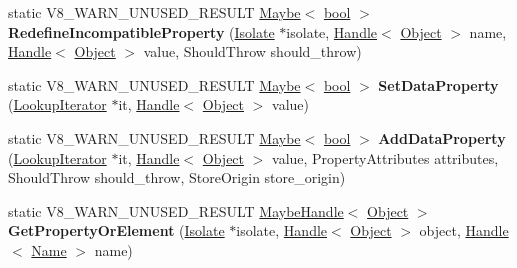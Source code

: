 \begin{DoxyCompactItemize}
static V8\+\_\+\+W\+A\+R\+N\+\_\+\+U\+N\+U\+S\+E\+D\+\_\+\+R\+E\+S\+U\+LT \mbox{\hyperlink{classv8_1_1Maybe}{Maybe}}$<$ \mbox{\hyperlink{classbool}{bool}} $>$ {\bfseries Redefine\+Incompatible\+Property} (\mbox{\hyperlink{classv8_1_1internal_1_1Isolate}{Isolate}} $\ast$isolate, \mbox{\hyperlink{classv8_1_1internal_1_1Handle}{Handle}}$<$ \mbox{\hyperlink{classv8_1_1internal_1_1Object}{Object}} $>$ name, \mbox{\hyperlink{classv8_1_1internal_1_1Handle}{Handle}}$<$ \mbox{\hyperlink{classv8_1_1internal_1_1Object}{Object}} $>$ value, Should\+Throw should\+\_\+throw)
\item 
\mbox{\label{classv8_1_1internal_1_1Object_a50e487fae51128bac1331b9f6acbc753}} 
static V8\+\_\+\+W\+A\+R\+N\+\_\+\+U\+N\+U\+S\+E\+D\+\_\+\+R\+E\+S\+U\+LT \mbox{\hyperlink{classv8_1_1Maybe}{Maybe}}$<$ \mbox{\hyperlink{classbool}{bool}} $>$ {\bfseries Set\+Data\+Property} (\mbox{\hyperlink{classv8_1_1internal_1_1LookupIterator}{Lookup\+Iterator}} $\ast$it, \mbox{\hyperlink{classv8_1_1internal_1_1Handle}{Handle}}$<$ \mbox{\hyperlink{classv8_1_1internal_1_1Object}{Object}} $>$ value)
\item 
\mbox{\label{classv8_1_1internal_1_1Object_affa0a3ce8c7bc8b3b1c9947c7f300000}} 
static V8\+\_\+\+W\+A\+R\+N\+\_\+\+U\+N\+U\+S\+E\+D\+\_\+\+R\+E\+S\+U\+LT \mbox{\hyperlink{classv8_1_1Maybe}{Maybe}}$<$ \mbox{\hyperlink{classbool}{bool}} $>$ {\bfseries Add\+Data\+Property} (\mbox{\hyperlink{classv8_1_1internal_1_1LookupIterator}{Lookup\+Iterator}} $\ast$it, \mbox{\hyperlink{classv8_1_1internal_1_1Handle}{Handle}}$<$ \mbox{\hyperlink{classv8_1_1internal_1_1Object}{Object}} $>$ value, Property\+Attributes attributes, Should\+Throw should\+\_\+throw, Store\+Origin store\+\_\+origin)
\item 
\mbox{\label{classv8_1_1internal_1_1Object_a33c5a40210c89c9870c2f07522a829bb}} 
static V8\+\_\+\+W\+A\+R\+N\+\_\+\+U\+N\+U\+S\+E\+D\+\_\+\+R\+E\+S\+U\+LT \mbox{\hyperlink{classv8_1_1internal_1_1MaybeHandle}{Maybe\+Handle}}$<$ \mbox{\hyperlink{classv8_1_1internal_1_1Object}{Object}} $>$ {\bfseries Get\+Property\+Or\+Element} (\mbox{\hyperlink{classv8_1_1internal_1_1Isolate}{Isolate}} $\ast$isolate, \mbox{\hyperlink{classv8_1_1internal_1_1Handle}{Handle}}$<$ \mbox{\hyperlink{classv8_1_1internal_1_1Object}{Object}} $>$ object, \mbox{\hyperlink{classv8_1_1internal_1_1Handle}{Handle}}$<$ \mbox{\hyperlink{classv8_1_1internal_1_1Name}{Name}} $>$ name)

\end{DoxyCompactItemize}
